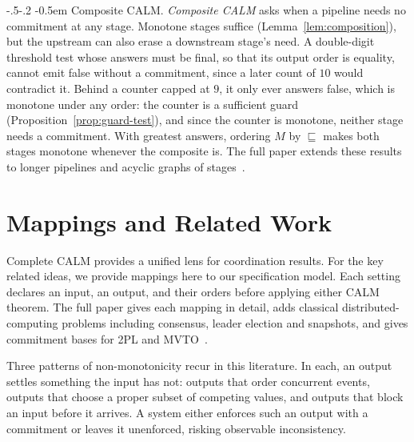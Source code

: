 \documentclass[sigconf]{cidr-2027}
\makeatletter
\theoremstyle{remark}
\renewcommand\paragraph{\@startsection{paragraph}{4}{\z@}%
  {-.5\baselineskip \@plus -2\p@ \@minus -.2\p@}%
  {-0.5em}%
  {\normalfont\bfseries}}
\newcommand{\commitment}{commitment\xspace}
\makeatother
\begin{document}
\paragraph{Composite CALM.}
\label{sec:composite-calm}
\emph{Composite CALM} asks when a pipeline needs no \commitment at any stage.
Monotone stages suffice (Lemma~\ref{lem:composition}), but the upstream can
also erase a downstream stage's need.  A double-digit threshold test whose
answers must be final, so that its output order is equality, cannot emit
\textsf{false} without a \commitment, since a later count of $10$ would
contradict it.  Behind a counter capped at $9$, it only ever answers
\textsf{false}, which is monotone under any order: the counter is a sufficient guard
(Proposition~\ref{prop:guard-test}), and since the counter is monotone,
neither stage needs a \commitment.  With greatest answers, ordering $M$ by
$\sqsubseteq$ makes both stages monotone whenever the composite is.  The full paper extends these results to
longer pipelines and acyclic graphs of stages~\cite{hellerstein2026completecalmfull}.

\section{Mappings and Related Work}
\label{sec:instances}
\label{sec:related}

Complete CALM provides a unified lens for coordination results. For
the key related ideas, we provide mappings here to our specification model. Each
setting declares an input, an output, and their orders before applying either
CALM theorem.  The full paper gives each
mapping in detail, adds classical distributed-computing problems
including consensus, leader election and snapshots, and gives \commitment bases
for 2PL and MVTO~\cite{hellerstein2026completecalmfull}.

Three patterns of non-monotonicity recur in this literature.  In each, an output settles something the input
has not:
outputs that order concurrent events,
outputs that choose a proper subset of competing values, and
outputs that block an input before it arrives.  A system either enforces such
an output with a \commitment or leaves it unenforced, risking observable
inconsistency.
\end{document}
